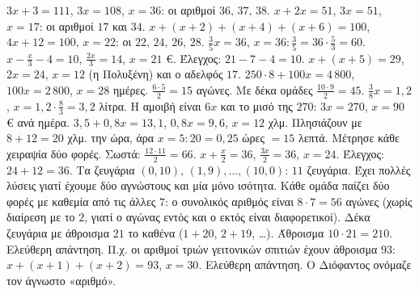  $3x+3=111$, $3x=108$, $x=36$: οι αριθμοί $36,\,37,\,38$.
 $x+2x=51$, $3x=51$, $x=17$: οι αριθμοί $17$ και $34$.
 $x+(x+2)+(x+4)+(x+6)=100$, $4x+12=100$, $x=22$: οι $22,\,24,\,26,\,28$.
 $\frac{3}{5}x=36$, $x=36:\frac{3}{5}=36\cdot\frac{5}{3}=60$.
 $x-\frac{x}{3}-4=10$, $\frac{2x}{3}=14$, $x=21$ €. Έλεγχος: $21-7-4=10$.
 $x+(x+5)=29$, $2x=24$, $x=12$ (η Πολυξένη) και ο αδελφός $17$.
 $250\cdot8+100x=4\,800$, $100x=2\,800$, $x=28$ ημέρες.
 $\frac{6\cdot5}{2}=15$ αγώνες. Με δέκα ομάδες $\frac{10\cdot9}{2}=45$.
 $\frac{3}{8}x=1{,}2$, $x=1{,}2\cdot\frac{8}{3}=3{,}2$ λίτρα.
 Η αμοιβή είναι $6x$ και το μισό της $270$: $3x=270$, $x=90$ € ανά ημέρα.
 $3{,}5+0{,}8x=13{,}1$, $0{,}8x=9{,}6$, $x=12$ χλμ.
 Πλησιάζουν με $8+12=20$ χλμ. την ώρα, άρα $x=5:20=0{,}25$ ώρες $=15$ λεπτά.
 Μέτρησε κάθε χειραψία δύο φορές. Σωστά: $\frac{12\cdot11}{2}=66$.
 $x+\frac{x}{2}=36$, $\frac{3x}{2}=36$, $x=24$. Έλεγχος: $24+12=36$.
 Τα ζευγάρια $(0,10),\,(1,9),\dots,(10,0)$: $11$ ζευγάρια. Έχει πολλές λύσεις γιατί έχουμε δύο αγνώστους και μία μόνο ισότητα.
 Κάθε ομάδα παίζει δύο φορές με καθεμία από τις άλλες $7$: ο συνολικός αριθμός είναι $8\cdot7=56$ αγώνες (χωρίς διαίρεση με το $2$, γιατί ο αγώνας εντός και ο εκτός είναι διαφορετικοί).
 Δέκα ζευγάρια με άθροισμα $21$ το καθένα ($1+20$, $2+19$, \dots). Άθροισμα $10\cdot21=210$.
 Ελεύθερη απάντηση. Π.χ. οι αριθμοί τριών γειτονικών σπιτιών έχουν άθροισμα $93$: $x+(x+1)+(x+2)=93$, $x=30$.
 Ελεύθερη απάντηση. Ο Διόφαντος ονόμαζε τον άγνωστο «αριθμό».
